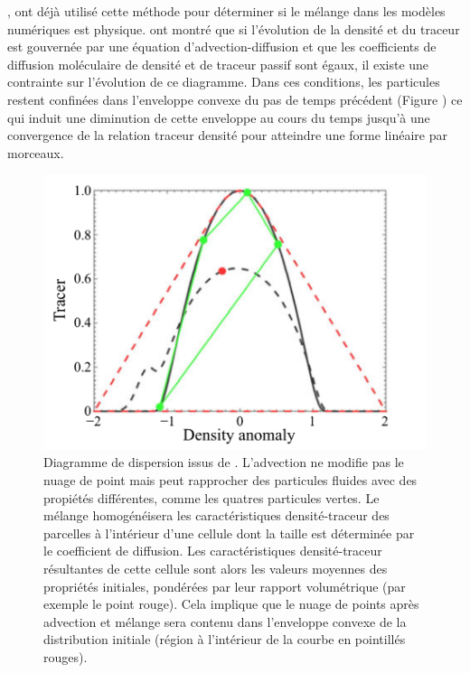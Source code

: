 \documentclass[a4paper,12pt]{article}
\begin{document}
        \newline
        \cite{plumb_tracer_2007}, \cite{lauritzen_evaluating_2012} ont déjà utilisé cette méthode pour déterminer si le mélange dans les modèles numériques est physique. \cite{penney_diapycnal_2020} ont montré que si l'évolution de la densité et du traceur est gouvernée par une équation d'advection-diffusion et que les coefficients de diffusion moléculaire de densité et de traceur passif sont égaux, il existe une contrainte sur l'évolution de ce diagramme. Dans ces conditions, les particules restent confinées dans l'enveloppe convexe du pas de temps précédent (Figure ) ce qui induit une diminution de cette enveloppe au cours du temps jusqu'à une convergence de la relation traceur densité pour atteindre une forme linéaire par morceaux.
        \begin{figure}[!h]
            \centering
            \label{Fig8}
            \includegraphics{figures/fig8_Jared.PNG}
            \caption{Diagramme de dispersion issus de \cite{penney_diapycnal_2020}. L'advection ne modifie pas le nuage de point mais peut rapprocher des particules fluides avec des propiétés différentes, comme les quatres particules vertes. Le mélange homogénéisera les caractéristiques densité-traceur des parcelles à l'intérieur d'une cellule dont la taille est déterminée par le coefficient de diffusion. Les caractéristiques densité-traceur résultantes de cette cellule sont alors les valeurs moyennes des propriétés initiales, pondérées par leur rapport volumétrique (par exemple le point rouge). Cela implique que le nuage de points après advection et mélange sera contenu dans l'enveloppe convexe de la distribution initiale (région à l'intérieur de la courbe en pointillés rouges).}
        \end{figure}
        
\end{document}
